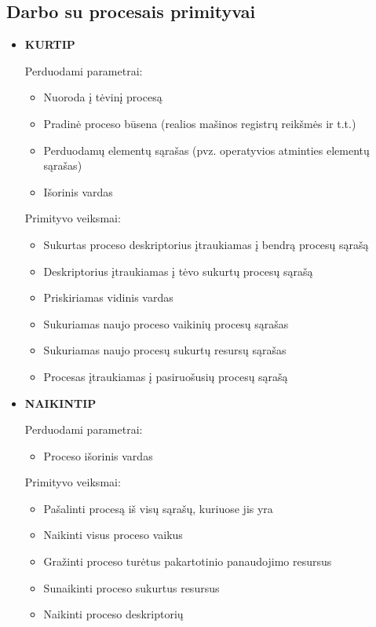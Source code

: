 \documentclass{scrartcl}
\begin{document}
      \subsection{Darbo su procesais primityvai}
      \begin{itemize}
        \item \textbf{KURTIP}
          \par
          Perduodami parametrai:
          \begin{itemize}
            \item Nuoroda į tėvinį procesą
            \item Pradinė proceso būsena (realios mašinos registrų reikšmės ir t.t.)
            \item Perduodamų elementų sąrašas (pvz. operatyvios atminties elementų sąrašas)
            \item Išorinis vardas
          \end{itemize}
          Primityvo veiksmai:
          \begin{itemize}
            \item Sukurtas proceso deskriptorius įtraukiamas į bendrą procesų sąrašą
            \item Deskriptorius įtraukiamas į tėvo sukurtų procesų sąrašą
            \item Priskiriamas vidinis vardas
            \item Sukuriamas naujo proceso vaikinių procesų sąrašas
            \item Sukuriamas naujo procesų sukurtų resursų sąrašas
            \item Procesas įtraukiamas į pasiruošusių procesų sąrašą
          \end{itemize}

        \item \textbf{NAIKINTIP}
          \par
          Perduodami parametrai:
          \begin{itemize}
            \item Proceso išorinis vardas
          \end{itemize}
          Primityvo veiksmai:
          \begin{itemize}
            \item Pašalinti procesą iš visų sąrašų, kuriuose jis yra
            \item Naikinti visus proceso vaikus
            \item Gražinti proceso turėtus pakartotinio panaudojimo resursus
            \item Sunaikinti proceso sukurtus resursus
            \item Naikinti proceso deskriptorių
          \end{itemize}


\end{itemize}
\end{document}
